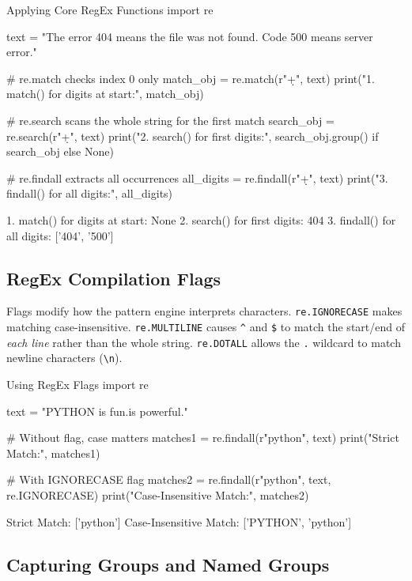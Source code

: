 \begin{pythoncode}{Applying Core RegEx Functions}
import re

text = "The error 404 means the file was not found. Code 500 means server error."

# re.match checks index 0 only
match_obj = re.match(r"\d+", text)
print("1. match() for digits at start:", match_obj)

# re.search scans the whole string for the first match
search_obj = re.search(r"\d+", text)
print("2. search() for first digits:", search_obj.group() if search_obj else None)

# re.findall extracts all occurrences
all_digits = re.findall(r"\d+", text)
print("3. findall() for all digits:", all_digits)
\end{pythoncode}
\begin{outputbox}
1. match() for digits at start: None
2. search() for first digits: 404
3. findall() for all digits: ['404', '500']
\end{outputbox}

\subsection{RegEx Compilation Flags}

Flags modify how the pattern engine interprets characters. \texttt{re.IGNORECASE} makes matching case-insensitive. \texttt{re.MULTILINE} causes \texttt{\textasciicircum} and \texttt{\$} to match the start/end of \textit{each line} rather than the whole string. \texttt{re.DOTALL} allows the \texttt{.} wildcard to match newline characters (\texttt{\textbackslash n}).

\begin{pythoncode}{Using RegEx Flags}
import re

text = "PYTHON is fun.\npython is powerful."

# Without flag, case matters
matches1 = re.findall(r"python", text)
print("Strict Match:", matches1)

# With IGNORECASE flag
matches2 = re.findall(r"python", text, re.IGNORECASE)
print("Case-Insensitive Match:", matches2)
\end{pythoncode}
\begin{outputbox}
Strict Match: ['python']
Case-Insensitive Match: ['PYTHON', 'python']
\end{outputbox}

\subsection{Capturing Groups and Named Groups}

